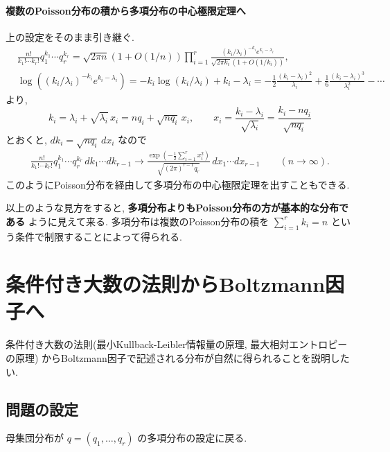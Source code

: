 \documentclass[12pt,twoside]{jarticle}
\theoremstyle{jplain}
\theoremstyle{jplain}
\theoremstyle{jplain}
\numberwithin{theorem}{section}
\numberwithin{equation}{section}
\numberwithin{figure}{section}
\numberwithin{table}{section}
\begin{document}
\paragraph{複数のPoisson分布の積から多項分布の中心極限定理へ}
上の設定をそのまま引き継ぐ.
\begin{align*}
&
\frac{n!}{k_1!\cdots k_r!} q_1^{k_1}\cdots q_r^{k_r}
=
\sqrt{2\pi n}(1+O(1/n))
\prod_{i=1}^r \frac{(k_i/\lambda_i)^{-k_i} e^{k_i-\lambda_i}}{\sqrt{2\pi k_i}(1+O(1/k_i))},
\\ &
\log((k_i/\lambda_i)^{-k_i}e^{k_i-\lambda_i})
=-k_i\log(k_i/\lambda_i)+k_i-\lambda_i
=-\frac{1}{2}\frac{(k_i-\lambda_i)^2}{\lambda_i}
+\frac{1}{6}\frac{(k_i-\lambda_i)^3}{\lambda_i^2}
-\cdots
\end{align*}
より,
\[
k_i
=\lambda_i+\sqrt{\lambda_i}\,x_i
=nq_i+\sqrt{nq_i}\,x_i,
\qquad
x_i=\frac{k_i-\lambda_i}{\sqrt{\lambda_i}}=\frac{k_i-nq_i}{\sqrt{nq_i}}
\]
とおくと, $dk_i=\sqrt{nq_i}\,dx_i$ なので
\begin{align*}
\frac{n!}{k_1!\cdots k_r!} q_1^{k_1}\cdots q_r^{k_r}\,dk_1\cdots dk_{r-1}
\longrightarrow
\frac
{\exp\left(-\frac{1}{2}\sum_{i=1}^r x_i^2\right)}
{\sqrt{(2\pi)^{r-1}q_r}}
\,dx_1\cdots dx_{r-1}
\qquad (n\to\infty).
\end{align*}
このようにPoisson分布を経由して多項分布の中心極限定理を出すこともできる.

以上のような見方をすると,
{\bfseries 多項分布よりもPoisson分布の方が基本的な分布である}
ように見えて来る. 多項分布は複数のPoisson分布の積を $\sum_{i=1}^r k_i=n$
という条件で制限することによって得られる.


\section{条件付き大数の法則からBoltzmann因子へ}
\label{sec:Boltzmann-factors}

条件付き大数の法則(最小Kullback-Leibler情報量の原理, 最大相対エントロピーの原理)
からBoltzmann因子で記述される分布が自然に得られることを説明したい.


\subsection{問題の設定}

母集団分布が $q=(q_1,\ldots,q_r)$ の多項分布の設定に戻る.
\end{document}
